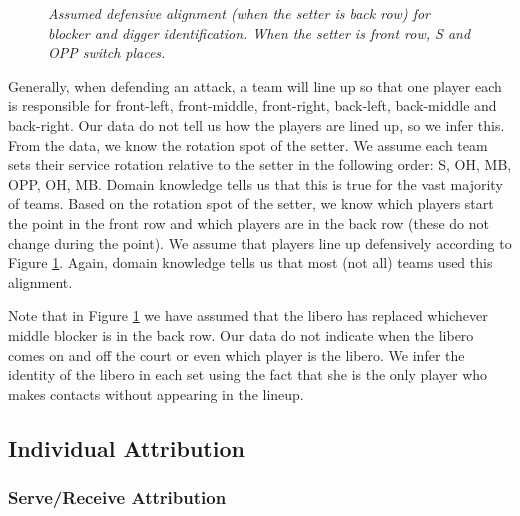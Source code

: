 \documentclass{article}
\begin{document}
\begin{figure}[hb]
    \centering
    \caption{\it Assumed defensive alignment (when the setter is back row) for blocker and digger identification. When the setter is front row, S and OPP switch places.}
    \label{fig:defensive-alignment}
\end{figure}

Generally, when defending an attack, a team will line up so that one player each is responsible for front-left, front-middle, front-right, back-left, back-middle and back-right. Our data do not tell us how the players are lined up, so we infer this. From the data, we know the rotation spot of the setter. We assume each team sets their service rotation relative to the setter in the following order: S, OH, MB, OPP, OH, MB. Domain knowledge tells us that this is true for the vast majority of teams. Based on the rotation spot of the setter, we know which players start the point in the front row and which players are in the back row (these do not change during the point). We assume that players line up defensively according to Figure \ref{fig:defensive-alignment}. Again, domain knowledge tells us that most (not all) teams used this alignment.

Note that in Figure \ref{fig:defensive-alignment} we have assumed that the libero has replaced whichever middle blocker is in the back row. Our data do not indicate when the libero comes on and off the court or even which player is the libero. We infer the identity of the libero in each set using the fact that she is the only player who makes contacts without appearing in the lineup.


\subsection{Individual Attribution}
\label{sec:attribution}

\subsubsection{Serve/Receive Attribution}
\end{document}
